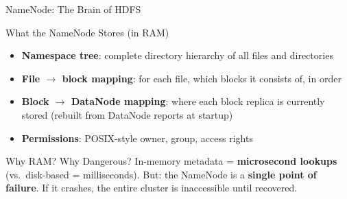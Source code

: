 \documentclass[aspectratio=169,10pt]{beamer}
\begin{document}
\begin{frame}{NameNode: The Brain of HDFS}
 
      \begin{block}{What the NameNode Stores (in RAM)}
        \begin{itemize}
          \item \textbf{Namespace tree}: complete directory hierarchy of all files and directories
          \item \textbf{File $\to$ block mapping}: for each file, which blocks it consists of, in order
          \item \textbf{Block $\to$ DataNode mapping}: where each block replica is currently stored (rebuilt from DataNode reports at startup)
          \item \textbf{Permissions}: POSIX-style owner, group, access rights
        \end{itemize}
      \end{block}
      \vspace{4pt}
      \begin{alertblock}{Why RAM? Why Dangerous?}
        In-memory metadata = \textbf{microsecond lookups} (vs.\ disk-based = milliseconds).  But: the NameNode is a \textbf{single point of failure}.  If it crashes, the entire cluster is inaccessible until recovered.
      \end{alertblock}

     
\end{frame}
\end{document}
